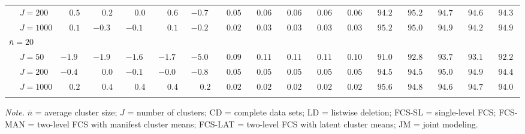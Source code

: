 \begin{sidewaystable}
\begin{threeparttable}
\begin{tabular}{llccccccccccccccc}
 & \nopagebreak $\;J=200$  & $\phantom{-}0.5\phantom{0}$ & $\phantom{-}0.2\phantom{0}$ & $\phantom{-}0.0\phantom{0}$ & $\phantom{-}0.6\phantom{0}$ & ${-}0.7\phantom{0}$ & $\phantom{0}0.05\phantom{0}$ & $\phantom{0}0.06\phantom{0}$ & $\phantom{0}0.06\phantom{0}$ & $\phantom{0}0.06\phantom{0}$ & $\phantom{0}0.06\phantom{0}$ & $\phantom{0}94.2\phantom{0}$ & $\phantom{0}95.2\phantom{0}$ & $\phantom{0}94.7\phantom{0}$ & $\phantom{0}94.6\phantom{0}$ & $\phantom{0}94.3\phantom{0}$ \\
 & \nopagebreak $\;J=1000$  & $\phantom{-}0.1\phantom{0}$ & ${-}0.3\phantom{0}$ & ${-}0.1\phantom{0}$ & $\phantom{-}0.1\phantom{0}$ & ${-}0.2\phantom{0}$ & $\phantom{0}0.02\phantom{0}$ & $\phantom{0}0.03\phantom{0}$ & $\phantom{0}0.03\phantom{0}$ & $\phantom{0}0.03\phantom{0}$ & $\phantom{0}0.03\phantom{0}$ & $\phantom{0}95.2\phantom{0}$ & $\phantom{0}95.0\phantom{0}$ & $\phantom{0}94.9\phantom{0}$ & $\phantom{0}94.2\phantom{0}$ & $\phantom{0}94.9\phantom{0}$ \\
\multicolumn{4}{l}{$\bar{n}=20$} \\  & \nopagebreak $\;J=50$  & ${-}1.9\phantom{0}$ & ${-}1.9\phantom{0}$ & ${-}1.6\phantom{0}$ & ${-}1.7\phantom{0}$ & ${-}5.0\phantom{0}$ & $\phantom{0}0.09\phantom{0}$ & $\phantom{0}0.11\phantom{0}$ & $\phantom{0}0.11\phantom{0}$ & $\phantom{0}0.11\phantom{0}$ & $\phantom{0}0.10\phantom{0}$ & $\phantom{0}91.0\phantom{0}$ & $\phantom{0}92.8\phantom{0}$ & $\phantom{0}93.7\phantom{0}$ & $\phantom{0}93.1\phantom{0}$ & $\phantom{0}92.2\phantom{0}$ \\
 & \nopagebreak $\;J=200$  & ${-}0.4\phantom{0}$ & $\phantom{-}0.0\phantom{0}$ & ${-}0.1\phantom{0}$ & ${-}0.0\phantom{0}$ & ${-}0.8\phantom{0}$ & $\phantom{0}0.05\phantom{0}$ & $\phantom{0}0.05\phantom{0}$ & $\phantom{0}0.05\phantom{0}$ & $\phantom{0}0.05\phantom{0}$ & $\phantom{0}0.05\phantom{0}$ & $\phantom{0}94.5\phantom{0}$ & $\phantom{0}94.5\phantom{0}$ & $\phantom{0}95.0\phantom{0}$ & $\phantom{0}94.9\phantom{0}$ & $\phantom{0}94.4\phantom{0}$ \\
 & \nopagebreak $\;J=1000$  & $\phantom{-}0.2\phantom{0}$ & $\phantom{-}0.4\phantom{0}$ & $\phantom{-}0.4\phantom{0}$ & $\phantom{-}0.4\phantom{0}$ & $\phantom{-}0.2\phantom{0}$ & $\phantom{0}0.02\phantom{0}$ & $\phantom{0}0.02\phantom{0}$ & $\phantom{0}0.02\phantom{0}$ & $\phantom{0}0.02\phantom{0}$ & $\phantom{0}0.02\phantom{0}$ & $\phantom{0}95.6\phantom{0}$ & $\phantom{0}94.8\phantom{0}$ & $\phantom{0}94.6\phantom{0}$ & $\phantom{0}94.7\phantom{0}$ & $\phantom{0}94.0\phantom{0}$ \\
[0.5ex]\hline\\[-1.6ex] 
\end{tabular}
\begin{tablenotes}{\footnotesize \textit{Note.} $\bar{n}$ = average cluster size; $J$ = number of clusters; CD = complete data sets; LD = listwise deletion; FCS-SL = single-level FCS; FCS-MAN = two-level FCS with manifest cluster means; FCS-LAT = two-level FCS with latent cluster means; JM = joint modeling.}\end{tablenotes}
\end{threeparttable}
\end{sidewaystable}
